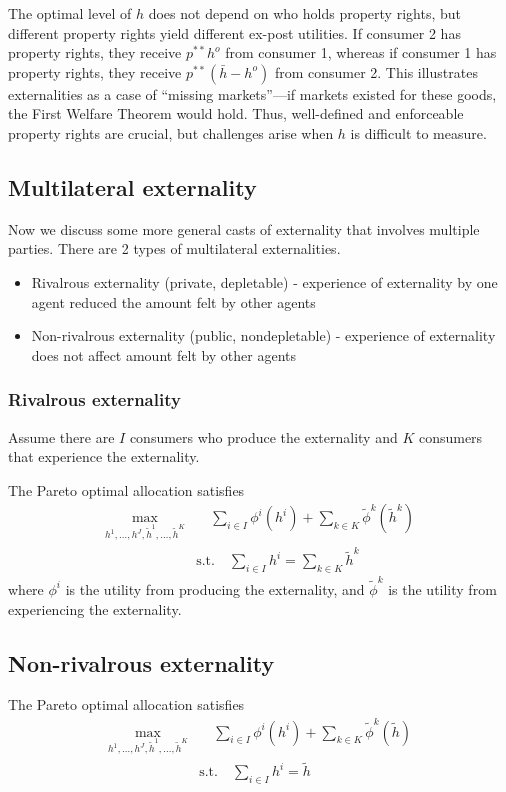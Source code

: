 \documentclass[twocolumn, fleqn]{article}
\begin{document}
		The optimal level of \( h \) does not depend on who holds property rights, but different property rights yield different ex-post utilities. If consumer 2 has property rights, they receive \( p^{**} h^o \) from consumer 1, whereas if consumer 1 has property rights, they receive \( p^{**} (\bar{h} - h^o) \) from consumer 2. This illustrates externalities as a case of ``missing markets''—if markets existed for these goods, the First Welfare Theorem would hold. Thus, well-defined and enforceable property rights are crucial, but challenges arise when \( h \) is difficult to measure.
		
		\subsection{Multilateral externality}
		Now we discuss some more general casts of externality that involves multiple parties. There are 2 types of multilateral externalities. 
		\begin{itemize}
			\item Rivalrous externality (private, depletable) - experience of externality by one agent reduced the amount felt by other agents
			\item Non-rivalrous externality (public, nondepletable) - experience of externality does not affect amount felt by other agents
		\end{itemize}
		
		\subsubsection{Rivalrous externality}
		Assume there are $I$ consumers who produce the externality and $K$ consumers that experience the externality.
		
		The Pareto optimal allocation satisfies 
		\begin{align*}
    	\max_{h^1, \dots, h^J, \tilde{h}^1, \dots, \tilde{h}^K} &\quad 
    	\sum_{i \in I} \phi^i(h^i) + \sum_{k \in K} \tilde{\phi}^k (\tilde{h}^k) \\[10pt]
    	&\text{s.t.} \quad \sum_{i \in I} h^i = \sum_{k \in K} \tilde{h}^k
		\end{align*}
		where $\phi^i$ is the utility from producing the externality, and $\tilde{\phi}^k$ is the utility from experiencing the externality. 
		
		\subsection{Non-rivalrous externality}
		The Pareto optimal allocation satisfies 
		\begin{align*}
    	\max_{h^1, \dots, h^J, \tilde{h}^1, \dots, \tilde{h}^K} &\quad 
    	\sum_{i \in I} \phi^i(h^i) + \sum_{k \in K} \tilde{\phi}^k (\tilde{h}) \\[10pt]
    	&\text{s.t.} \quad \sum_{i \in I} h^i =  \tilde{h}
		\end{align*}
		 
\end{document}
